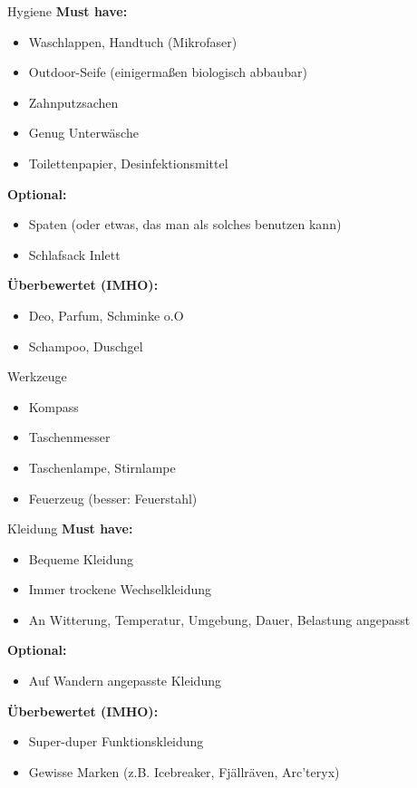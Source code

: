 \documentclass{beamer}
\begin{document}
			\begin{frame}{Hygiene}
				\textbf{Must have:}
				\begin{itemize}
					\item Waschlappen, Handtuch (Mikrofaser)
					\item Outdoor-Seife (einigermaßen biologisch abbaubar)
					\item Zahnputzsachen
					\item Genug Unterwäsche
					\item Toilettenpapier, Desinfektionsmittel
				\end{itemize}\pause
				\textbf{Optional:}
				\begin{itemize}
					\item Spaten (oder etwas, das man als solches benutzen kann)
					\item Schlafsack Inlett
				\end{itemize}\pause
				\textbf{Überbewertet (IMHO):}
				\begin{itemize}
					\item Deo, Parfum, Schminke o.O
					\item Schampoo, Duschgel
				\end{itemize}
			\end{frame}
			
			\begin{frame}{Werkzeuge}
				\begin{itemize}
					\item Kompass
					\item Taschenmesser
					\item Taschenlampe, Stirnlampe
					\item Feuerzeug (besser: Feuerstahl)
				\end{itemize}
			\end{frame}
			
			\begin{frame}{Kleidung}
				\textbf{Must have:}
				\begin{itemize}
					\item Bequeme Kleidung
					\item Immer trockene Wechselkleidung
					\item An Witterung, Temperatur, Umgebung, Dauer, Belastung angepasst
				\end{itemize}\pause
				\textbf{Optional:}
				\begin{itemize}
					\item Auf Wandern angepasste Kleidung
				\end{itemize}\pause
				\textbf{Überbewertet (IMHO):}
				\begin{itemize}
					\item Super-duper Funktionskleidung
					\item Gewisse Marken (z.B. Icebreaker, Fjällräven, Arc'teryx)
				\end{itemize}
			\end{frame}
			
\end{document}
